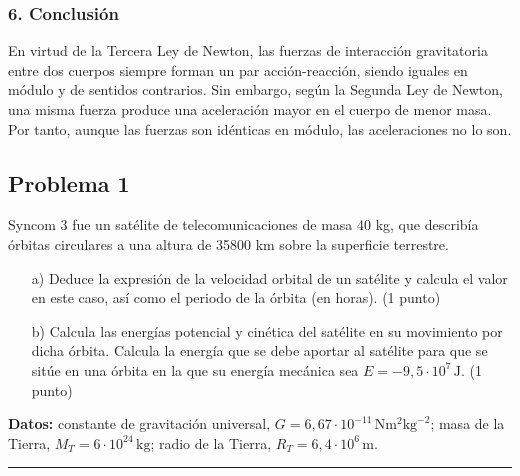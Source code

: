 \subsubsection*{6. Conclusión}
\begin{cajaconclusion}
En virtud de la Tercera Ley de Newton, las fuerzas de interacción gravitatoria entre dos cuerpos siempre forman un par acción-reacción, siendo iguales en módulo y de sentidos contrarios. Sin embargo, según la Segunda Ley de Newton, una misma fuerza produce una aceleración mayor en el cuerpo de menor masa. Por tanto, aunque las fuerzas son idénticas en módulo, las aceleraciones no lo son.
\end{cajaconclusion}

\newpage
\subsection{Problema 1}
\label{subsec:P1_2020_jul_ext_b}

\begin{cajaenunciado}
Syncom 3 fue un satélite de telecomunicaciones de masa 40 kg, que describía órbitas circulares a una altura de 35800 km sobre la superficie terrestre.
\begin{enumerate}
    \item[a)] Deduce la expresión de la velocidad orbital de un satélite y calcula el valor en este caso, así como el periodo de la órbita (en horas). (1 punto)
    \item[b)] Calcula las energías potencial y cinética del satélite en su movimiento por dicha órbita. Calcula la energía que se debe aportar al satélite para que se sitúe en una órbita en la que su energía mecánica sea $E=-9,5\cdot10^7\,\text{J}$. (1 punto)
\end{enumerate}
\textbf{Datos:} constante de gravitación universal, $G=6,67\cdot10^{-11}\,\text{N}\text{m}^2\text{kg}^{-2}$; masa de la Tierra, $M_T=6\cdot10^{24}\,\text{kg}$; radio de la Tierra, $R_T=6,4\cdot10^6\,\text{m}$.
\end{cajaenunciado}
\hrule

